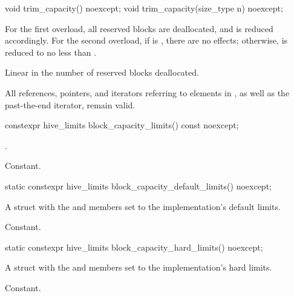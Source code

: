 %
\begin{itemdecl}
void trim_capacity() noexcept;
void trim_capacity(size_type n) noexcept;
\end{itemdecl}

\begin{itemdescr}
\pnum
\effects
For the first overload, all reserved blocks are deallocated, and
 is reduced accordingly.
For the second overload,
if  is ,
there are no effects;
otherwise,  is reduced to no less than .

\pnum
\complexity
Linear in the number of reserved blocks deallocated.

\pnum
\remarks
All references, pointers, and iterators referring to elements in ,
as well as the past-the-end iterator, remain valid.
\end{itemdescr}

%
\begin{itemdecl}
constexpr hive_limits block_capacity_limits() const noexcept;
\end{itemdecl}

\begin{itemdescr}
\pnum
\returns
{}.

\pnum
\complexity
Constant.
\end{itemdescr}

%
\begin{itemdecl}
static constexpr hive_limits block_capacity_default_limits() noexcept;
\end{itemdecl}

\begin{itemdescr}
\pnum
\returns
A  struct
with the  and  members set to
the implementation's default limits.

\pnum
\complexity
Constant.
\end{itemdescr}

%
\begin{itemdecl}
static constexpr hive_limits block_capacity_hard_limits() noexcept;
\end{itemdecl}

\begin{itemdescr}
\pnum
\returns
A  struct
with the  and  members set to
the implementation's hard limits.

\pnum
\complexity
Constant.
\end{itemdescr}

